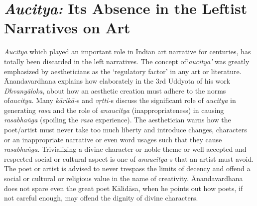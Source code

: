 \vspace{-.4cm}

\section*{\textit{Aucitya:} Its Absence in the Leftist Narratives on Art}

\textit{Aucitya} which played an important role in Indian art narrative for centuries, has totally been discarded in the left narratives. The concept of‘\textit{aucitya’} was greatly emphasized by aestheticians as the ‘regulatory factor’ in any art or literature. Ānandavardhana explains how elaborately in the 3rd Uddyota of his work \textit{Dhvanyāloka}, about how an aesthetic creation must adhere to the norms of\textit{aucitya.} Many \textit{kārikā-}s and \textit{vṛtti-}s discuss the significant role of \textit{aucitya} in generating \textit{rasa} and the role of \textit{anaucitya} (inappropriateness) in causing \textit{rasabhaṅga} (spoiling the \textit{rasa} experience). The aesthetician warns how the poet/artist must never take too much liberty and introduce changes, characters or an inappropriate narrative or even word usages such that they cause \textit{rasabhaṅga}. Trivializing a divine character or noble theme or well accepted and respected social or cultural aspect is one of \textit{anaucitya-}s that an artist must avoid. The poet or artist is advised to never trespass the limits of decency and offend a social or cultural or religious value in the name of creativity. Ānandavardhana does not spare even the great poet Kālidāsa, when he points out how poets, if not careful enough, may offend the dignity of divine characters.
